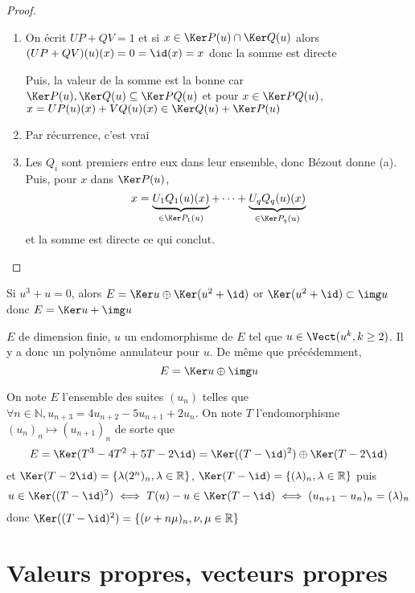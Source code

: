 \begin{proof}~
    \begin{enumerate}
        \item On écrit $UP+QV=1$ et si $x\in\Ker P(u)\cap \Ker Q(u)$ alors $(UP+QV)(u)(x)=0=\id(x)=x$ donc la somme est directe

            Puis, la valeur de la somme est la bonne car $\Ker P(u),\Ker Q(u)\subseteq \Ker PQ(u)$ et pour $x\in \Ker PQ(u)$, $x=UP(u)(x)+VQ(u)(x)\in \Ker Q(u)+\Ker P(u)$
        \item Par récurrence, c'est vrai
        \item Les $Q_i$ sont premiers entre eux dans leur ensemble, donc Bézout donne (a). Puis, pour $x$ dans $\Ker P(u)$, \[
                x= \underbrace{U_1Q_1(u)(x)}_{\in\Ker P_1(u)}+\cdots +\underbrace{U_qQ_q(u)(x)}_{\in\Ker P_q(u)}
            \]
            et la somme est directe ce qui conclut.
    \end{enumerate}
\end{proof}

\begin{ex}
    Si $u^3+u=0$, alors $E=\Ker u\oplus \Ker(u^2+\id)$ or $\Ker(u^2+\id)\subset \img u$ donc $E=\Ker u+\img u$
\end{ex}

\begin{ex}
    $E$ de dimension finie, $u$ un endomorphisme de $E$ tel que $u\in\Vect(u^k, k\geq 2)$. Il y a donc un polynôme annulateur pour $u$. De même que précédemment, \[
        E=\Ker u\oplus \img u
    \]
\end{ex}

\begin{ex}
    On note $E$ l'ensemble des suites $(u_n)$ telles que $\forall n\in\mathbb N, u_{n+3}=4u_{n+2}-5u_{n+1}+2u_n$. On note $T$ l'endomorphisme $(u_n)_n\longmapsto (u_{n+1})_n$ de sorte que \[
        E=\Ker(T^3-4T^2+5T-2\id)=\Ker((T-\id)^2)\oplus \Ker(T-2\id)
    \]
    et $\Ker(T-2\id)=\{\lambda (2^n)_n, \lambda\in\mathbb R\}$, $\Ker(T-\id)=\{(\lambda)_n, \lambda\in\mathbb R\}$ puis \[
        u\in \Ker((T-\id)^2)\iff T(u)-u\in\Ker(T-\id)\iff (u_{n+1}-u_n)_n=(\lambda)_n
    \]
    donc $\Ker((T-\id)^2)=\{(\nu+n\mu)_n, \nu, \mu\in\mathbb R\}$
\end{ex}

\section{Valeurs propres, vecteurs propres}

